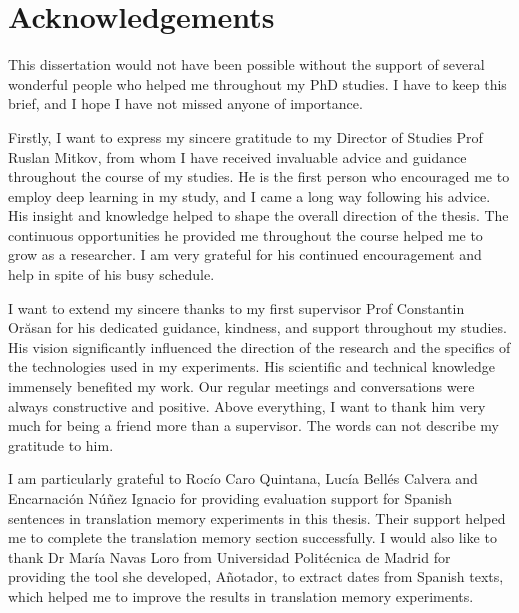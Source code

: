 \newpage
{} \label{ack}

\chapter*{Acknowledgements}
This dissertation would not have been possible without the support of several wonderful people who helped me throughout my PhD studies. I have to keep this brief, and I hope I have not missed anyone of importance.

Firstly, I want to express my sincere gratitude to my Director of Studies Prof Ruslan Mitkov, from whom I have received invaluable advice and guidance throughout the course of my studies. He is the first person who encouraged me to employ deep learning in my study, and I came a long way following his advice. His insight and knowledge helped to shape the overall direction of the thesis. The continuous opportunities he provided me throughout the course helped me to grow as a researcher. I am very grateful for his continued encouragement and help in spite of his busy schedule.

I want to extend my sincere thanks to my first supervisor Prof Constantin Orăsan for his dedicated guidance, kindness, and support throughout my studies. His vision significantly influenced the direction of the research and the specifics of the technologies used in my experiments. His scientific and technical knowledge immensely benefited my work. Our regular meetings and conversations were always constructive and positive. Above everything, I want to thank him very much for being a friend more than a supervisor. The words can not describe my gratitude to him.

I am particularly grateful to Rocío Caro Quintana, Lucía Bellés Calvera and Encarnación Núñez Ignacio for providing evaluation support for Spanish sentences in translation memory experiments in this thesis. Their support helped me to complete the translation memory section successfully. I would also like to thank Dr María Navas Loro from Universidad Politécnica de Madrid for providing the tool she developed, Añotador, to extract dates from Spanish texts, which helped me to improve the results in translation memory experiments.


